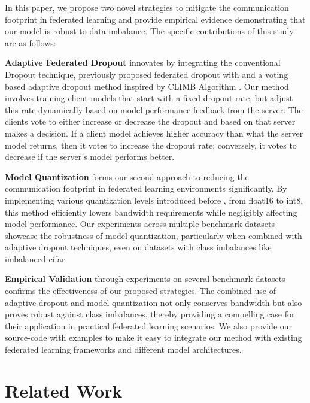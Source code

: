 \documentclass{article}
\begin{document}
In this paper, we propose two novel strategies to mitigate the communication footprint in federated learning and provide empirical evidence demonstrating that our model is robust to data imbalance. The specific contributions of this study are as follows:

\textbf{Adaptive Federated Dropout} innovates by integrating the conventional Dropout \cite{srivastava2014dropout} technique, previously proposed federated dropout \cite{wen2022federated, caldas2018expanding} with and a voting based adaptive dropout method inspired by CLIMB Algorithm \cite{shen2021agnostic}. Our method involves training client models that start with a fixed dropout rate, but adjust this rate dynamically based on model performance feedback from the server. The clients vote to either increase or decrease the dropout and based on that server makes a decision. If a client model achieves higher accuracy than what the server model returns, then it votes to increase the dropout rate; conversely, it votes to decrease if the server's model performs better.\par

\textbf{Model Quantization} forms our second approach to reducing the communication footprint in federated learning environments significantly. By implementing various quantization levels introduced before \cite{jacob2018quantization}, from float16 to int8, this method efficiently lowers bandwidth requirements while negligibly affecting model performance. Our experiments across multiple benchmark datasets showcase the robustness of model quantization, particularly when combined with adaptive dropout techniques, even on datasets with class imbalances like imbalanced-cifar.\par

\textbf{Empirical Validation} through experiments on several benchmark datasets confirms the effectiveness of our proposed strategies. The combined use of adaptive dropout and model quantization not only conserves bandwidth but also proves robust against class imbalances, thereby providing a compelling case for their application in practical federated learning scenarios. We also provide our source-code with examples to make it easy to integrate our method with existing federated learning frameworks and different model architectures.\par

\section{Related Work}
\end{document}
